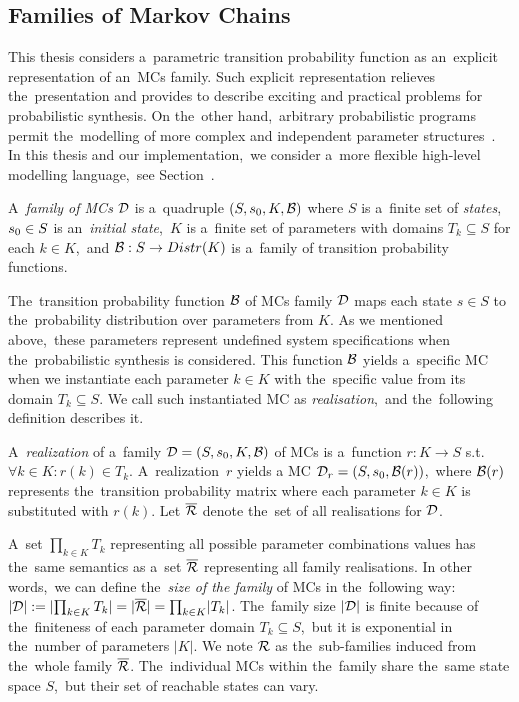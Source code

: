\subsection{Families of Markov Chains}
This thesis considers a~parametric transition probability function as an~explicit representation of an~MCs family.
Such explicit representation relieves the~presentation and provides to describe exciting and practical problems for probabilistic synthesis.
On the~other hand,~arbitrary probabilistic programs permit the~modelling of more complex and independent parameter structures~\cite{cegar}.
In this thesis and our implementation,~we consider a~more flexible high-level modelling language,~see Section~.

\begin{definition}
\cite{cegar}
    A~\emph{family of MCs} $\mathcal{D}$ is a~quadruple $(S,s_{0},K,\mathcal{B})$  where $S$ is a~finite set of \emph{states}, $s_{0} \in S$ is an~\emph{initial state},~$K$ is a~finite set of parameters with domains $T_k \subseteq S$ for each $k \in K$,~and $\mathcal{B} : S \rightarrow Distr(K)$ is a~family of transition probability functions.
\end{definition}

The~transition probability function $\mathcal{B}$ of MCs family $\mathcal{D}$ maps each state $s \in S$ to the~probability distribution over parameters from $K$.
As we mentioned above,~these parameters represent undefined system specifications when the~probabilistic synthesis is considered.
This function $\mathcal{B}$ yields a~specific MC when we instantiate each parameter $k \in K$ with the~specific value from its domain $T_k \subseteq S$.
We call such instantiated MC as \textit{realisation},~and the~following definition describes it.

\begin{definition}[Realisation]
\cite{cegar}
A~\emph{realization} of a~family $\mathcal{D} = (S,s_{0},K,\mathcal{B})$ of MCs is a~function $r: K \rightarrow S$ s.t.~$\forall k \in K :  r(k) \in T_k$. 
A~realization~$r$ yields a MC $\mathcal{D}_r = (S,s_{0},\mathcal{B}(r))$,~where $\mathcal{B}(r)$ represents the~transition probability matrix where each parameter $k \in K$ is substituted with $r(k)$. 
Let $\overline{\mathcal{R}}$ denote the~set of all realisations for $\mathcal{D}$.
\end{definition}

A~set $\prod_{k \in K} T_k$ representing all possible parameter combinations values has the~same semantics as a~set $\overline{\mathcal{R}}$ representing all family realisations.
In other words,~we can define the~\textit{size of the family} of MCs in the~following way: $\lvert \mathcal{D} \rvert := \lvert \prod_{k \in K} T_k \rvert = \lvert \overline{\mathcal{R}} \rvert = \prod_{k \in K} \lvert T_k \rvert$.
The~family size $\lvert \mathcal{D} \rvert$ is finite because of the~finiteness of each parameter domain $T_k \subseteq S$,~but it is exponential in the~number of parameters $\lvert K \rvert$.
We note $\mathcal{R}$ as the~sub-families induced from the~whole family $\overline{\mathcal{R}}$.
The~individual MCs within the~family share the~same state space $S$,~but their set of reachable states can vary.

